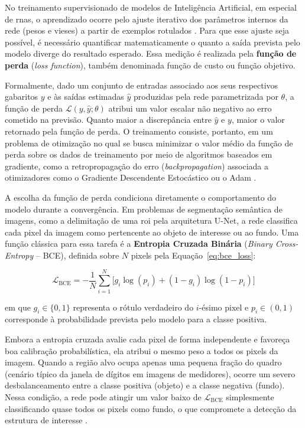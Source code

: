 No treinamento supervisionado de modelos de Inteligência Artificial, em especial de
\glspl{rna}, o aprendizado ocorre pelo ajuste iterativo dos parâmetros internos da rede
(pesos e vieses) a partir de exemplos rotulados \cite{jesus2023inteligencia}. Para que
esse ajuste seja possível, é necessário quantificar matematicamente o quanto a saída
prevista pelo modelo diverge do resultado esperado. Essa medição é realizada pela
\textbf{função de perda} (\textit{loss function}), também denominada função de custo ou
função objetivo.

Formalmente, dado um conjunto de entradas associado aos seus respectivos gabaritos $y$ e às
saídas estimadas $\hat{y}$ produzidas pela rede parametrizada por $\theta$, a função de
perda $\mathcal{L}(y, \hat{y}; \theta)$ atribui um valor escalar não negativo ao erro
cometido na previsão. Quanto maior a discrepância entre $\hat{y}$ e $y$, maior o valor
retornado pela função de perda. O treinamento consiste, portanto, em um problema de
otimização no qual se busca minimizar o valor médio da função de perda sobre os dados de
treinamento por meio de algoritmos baseados em gradiente, como a retropropagação do erro
(\textit{backpropagation}) associada a otimizadores como o Gradiente Descendente
Estocástico ou o Adam \cite{goodfellow2016deep}.


A escolha da função de perda condiciona diretamente o comportamento do modelo durante a
convergência. Em problemas de segmentação semântica de imagens, como a delimitação de uma
\gls{roi} pela arquitetura U-Net, a rede classifica cada
pixel da imagem como pertencente ao objeto de interesse ou ao fundo. Uma função clássica
para essa tarefa é a \textbf{Entropia Cruzada Binária} (\textit{Binary Cross-Entropy} --
BCE), definida sobre $N$ pixels pela Equação~\eqref{eq:bce_loss}:

\begin{equation}
    \label{eq:bce_loss}
    \mathcal{L}_{\text{BCE}} = -\frac{1}{N} \sum_{i=1}^{N} \Big[ g_i \log(p_i) + (1 - g_i)\log(1 - p_i) \Big]
\end{equation}

\noindent em que $g_i \in \{0, 1\}$ representa o rótulo verdadeiro do $i$-ésimo pixel e
$p_i \in (0, 1)$ corresponde à probabilidade prevista pelo modelo para a classe positiva.

Embora a entropia cruzada avalie cada pixel de forma independente e favoreça boa
calibração probabilística, ela atribui o mesmo peso a todos os pixels da imagem. Quando a
região alvo ocupa apenas uma pequena fração do quadro (cenário típico da janela de dígitos
em imagens de medidores), ocorre um severo desbalanceamento entre a classe positiva
(objeto) e a classe negativa (fundo). Nessa condição, a rede pode atingir um valor baixo
de $\mathcal{L}_{\text{BCE}}$ simplesmente classificando quase todos os pixels como fundo,
o que compromete a detecção da estrutura de interesse \cite{jadon2020survey}.

